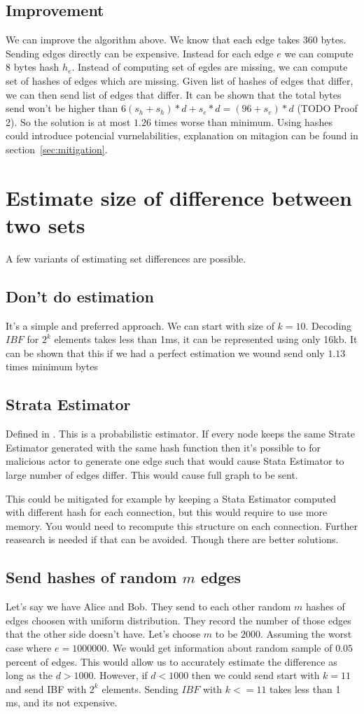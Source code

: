 \documentclass[11pt]{article}
\begin{document}
\subsection{Improvement}
We can improve the algorithm above. We know that each edge takes 360 bytes. Sending edges directly can be expensive. Instead for each edge $e$ we can compute 8 bytes hash $h_e$.
Instead of computing set of egdes are missing, we can compute set of hashes of edges which are missing. Given list of hashes of edges that differ, we can then send list of edges that differ.
It can be shown that the total bytes send won't be higher than $6(s_h+s_h)*d + s_e * d = (96+s_e)*d$ (TODO Proof 2). So the solution is at most $1.26$ times worse than minimum.
Using hashes could introduce potencial vurnelabilities, explanation on mitagion can be found in section~\ref{sec:mitigation}.

\section{Estimate size of difference between two sets}\label{sec:estimate}
A few variants of estimating set differences are possible.
\subsection{Don't do estimation}
It's a simple and preferred approach.
We can start with size of $k = 10$. Decoding $IBF$ for $2^k$ elements takes less than 1ms, it can be represented using only 16kb.
It can be shown that this if we had a perfect estimation we wound send only $1.13$ times minimum bytes

\subsection{Strata Estimator}
Defined in \cite{esrwpc}.
This is a probabilistic estimator. If every node keeps the same Strate Estimator generated with the same hash function then it's possible to for malicious actor to generate one edge such that would cause Stata Estimator to large number of edges differ. This would cause full graph to be sent.

This could be mitigated for example by keeping a Stata Estimator computed with different hash for each connection, but this would require to use more memory.
You would need to recompute this structure on each connection.
Further reasearch is needed if that can be avoided. Though there are better solutions.
\subsection{Send hashes of random $m$ edges}
Let's say we have Alice and Bob.
They send to each other random $m$ hashes  of edges choosen with uniform distribution.
They record the number of those edges that the other side doesn't have.
Let's choose $m$ to be $2000$.
Assuming the worst case where $e = 1000000$. We would get information about random sample of $0.05$ percent of edges.
This would allow us to accurately estimate the difference as long as the $d > 1000$.
However, if $d < 1000$ then we could send start with $k = 11$ and send IBF with $2^k$ elements.
Sending $IBF$ with $k <= 11$ takes less than 1 ms, and its not expensive.
\end{document}
